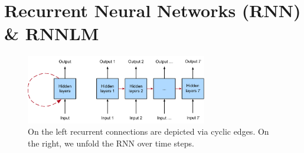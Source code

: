 \chapter{Recurrent Neural Networks (RNN) \& RNNLM}


\begin{figure}[H]
    \centering
    \includegraphics[width=\linewidth, height=3cm, keepaspectratio]{Pictures/Recurrent-Neural-Networks/unfolded-rnn.jpg}
    \caption*{On the left recurrent connections are depicted via cyclic edges. On the right, we unfold the RNN over time steps.}
\end{figure}


